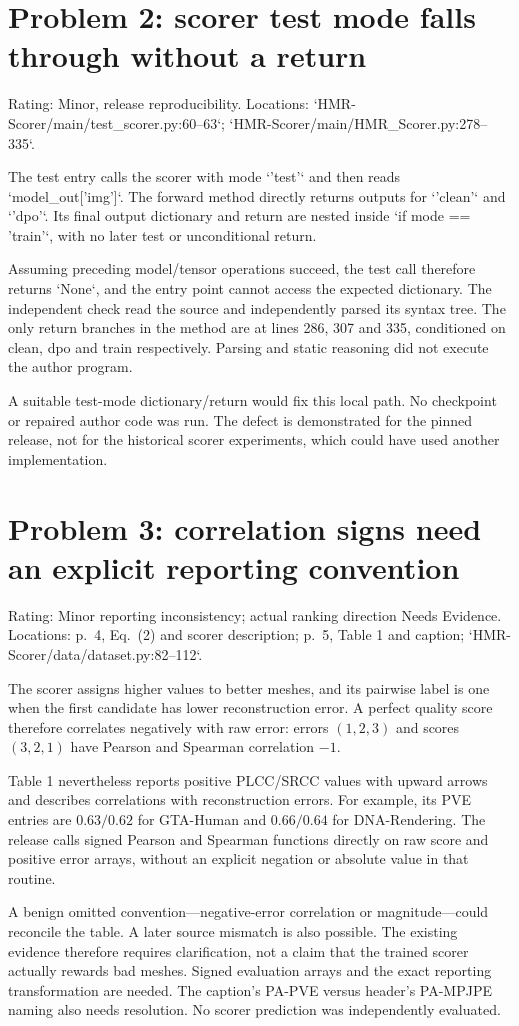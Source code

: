 \documentclass[10pt]{article}
\begin{document}
\section*{Problem 2: scorer test mode falls through without a return}
Rating: Minor, release reproducibility. Locations: `HMR-Scorer/main/test\_scorer.py:60--63`; `HMR-Scorer/main/HMR\_Scorer.py:278--335`.\par
The test entry calls the scorer with mode `’test’` and then reads `model\_out[’img’]`. The forward method directly returns outputs for `’clean’` and `’dpo’`. Its final output dictionary and return are nested inside `if mode == ’train’`, with no later test or unconditional return.\par
Assuming preceding model/tensor operations succeed, the test call therefore returns `None`, and the entry point cannot access the expected dictionary. The independent check read the source and independently parsed its syntax tree. The only return branches in the method are at lines 286, 307 and 335, conditioned on clean, dpo and train respectively. Parsing and static reasoning did not execute the author program.\par
A suitable test-mode dictionary/return would fix this local path. No checkpoint or repaired author code was run. The defect is demonstrated for the pinned release, not for the historical scorer experiments, which could have used another implementation.\par
\section*{Problem 3: correlation signs need an explicit reporting convention}
Rating: Minor reporting inconsistency; actual ranking direction Needs Evidence. Locations: p. 4, Eq. (2) and scorer description; p. 5, Table 1 and caption; `HMR-Scorer/data/dataset.py:82–112`.\par
The scorer assigns higher values to better meshes, and its pairwise label is one when the first candidate has lower reconstruction error. A perfect quality score therefore correlates negatively with raw error: errors \((1,2,3)\) and scores \((3,2,1)\) have Pearson and Spearman correlation \(-1\).\par
Table 1 nevertheless reports positive PLCC/SRCC values with upward arrows and describes correlations with reconstruction errors. For example, its PVE entries are \(0.63/0.62\) for GTA-Human and \(0.66/0.64\) for DNA-Rendering. The release calls signed Pearson and Spearman functions directly on raw score and positive error arrays, without an explicit negation or absolute value in that routine.\par
A benign omitted convention—negative-error correlation or magnitude—could reconcile the table. A later source mismatch is also possible. The existing evidence therefore requires clarification, not a claim that the trained scorer actually rewards bad meshes. Signed evaluation arrays and the exact reporting transformation are needed. The caption’s PA-PVE versus header’s PA-MPJPE naming also needs resolution. No scorer prediction was independently evaluated.\par
\end{document}
